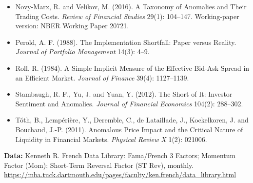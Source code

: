 \begin{itemize}
  \item Novy-Marx, R. and Velikov, M. (2016). A Taxonomy of Anomalies and Their Trading Costs. \emph{Review of Financial Studies} 29(1): 104--147. Working-paper version: NBER Working Paper 20721.
  \item Perold, A. F. (1988). The Implementation Shortfall: Paper versus Reality. \emph{Journal of Portfolio Management} 14(3): 4--9.
  \item Roll, R. (1984). A Simple Implicit Measure of the Effective Bid-Ask Spread in an Efficient Market. \emph{Journal of Finance} 39(4): 1127--1139.
  \item Stambaugh, R. F., Yu, J. and Yuan, Y. (2012). The Short of It: Investor Sentiment and Anomalies. \emph{Journal of Financial Economics} 104(2): 288--302.
  \item T\'oth, B., Lemp\'eri\`ere, Y., Deremble, C., de Lataillade, J., Kockelkoren, J. and Bouchaud, J.-P. (2011). Anomalous Price Impact and the Critical Nature of Liquidity in Financial Markets. \emph{Physical Review X} 1(2): 021006.
\end{itemize}

\textbf{Data:} Kenneth R. French Data Library: Fama/French 3 Factors; Momentum Factor (Mom); Short-Term Reversal Factor (ST Rev), monthly. \url{https://mba.tuck.dartmouth.edu/pages/faculty/ken.french/data_library.html}
